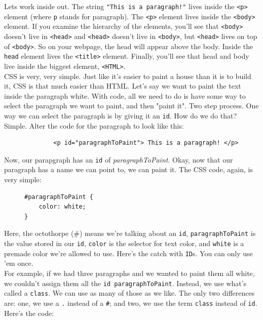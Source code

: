 \documentclass[11pt, letterpaper]{article}
\begin{document}
Lets work inside out. The string \verb+"This is a paragraph!"+ lives inside the \verb+<p>+ element (where \verb+p+
stands for paragraph). The \verb+<p>+ element lives inside the \verb+<body>+ element. If you examine the hierarchy
of the elements, you'll see that \verb+<body>+ doesn't live in \verb+<head>+ and \verb+<head>+ doesn't live in \verb+<body>+, but 
\verb+<head>+ lives on top of \verb+<body>+. So on your webpage, the head will appear above the body. Inside the \verb+head+ element lives the 
\verb+<title>+ element. Finally, you'll see that head and body live inside the biggest element, \verb+<HTML>+. \\

CSS is very, very simple. Just like it's easier to paint a house than it is to build it, CSS is that much easier than
HTML. Let's say we want to paint the text inside the paragraph white. With code, all we need to do is have some way
to select the paragraph we want to paint, and then "paint it". Two step process. One way we can select the paragraph is
by giving it an \verb+id+. How do we do that? Simple. Alter the code for the paragraph to look like this: \\

\begin{figure}[ht]
\centering
\begin{BVerbatim}
        <p id="paragraphToPaint"> This is a paragraph! </p>
\end{BVerbatim}
\end{figure}

Now, our parapgraph has an \verb+id+ of \emph{paragraphToPaint}. Okay, now that our paragraph has a name we can point to,
we can paint it. The CSS code, again, is very simple: \\

\begin{figure}[ht]
\centering
\begin{BVerbatim}
#paragraphToPaint {
    color: white;
}
\end{BVerbatim}
\end{figure}

Here, the octothorpe (\#) means we're talking about an \verb+id+, \verb+paragraphToPaint+ is the value stored in our
\verb+id+, \verb+color+ is the selector for text color, and \verb+white+ is a premade color we're allowed to use. Here's the 
catch with \verb+ID+s. You can only use 'em once. \\

For example, if we had three paragraphs and we wanted to paint them
all white, we couldn't assign them all the \verb+id paragraphToPaint+. Instead, we use what's called a \verb+class+.
We can use as many of those as we like. The only two differences are: one, we use a \verb+.+ instead of a \verb+#+; 
and two, we use the term \verb+class+ instead of \verb+id+. Here's the code:
\end{document}

